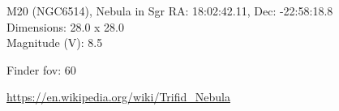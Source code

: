 \begin{block}{M20 (NGC6514), Nebula in Sgr}
    RA: 18:02:42.11, Dec: -22:58:18.8 \\ 
    Dimensions: 28.0 x 28.0 \\ 
    Magnitude (V): 8.5



    Finder fov: 60 

    \url{https://en.wikipedia.org/wiki/Trifid_Nebula} 
\end{block}